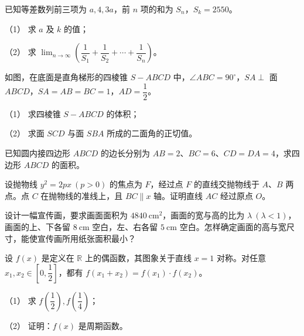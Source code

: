 \begin{question}
已知等差数列前三项为 $a,4,3a$，前 $n$ 项的和为 $S_n$，$S_k=2550$。

（1） 求 $a$ 及 $k$ 的值；

（2） 求 $\displaystyle\lim_{n\to\infty}\left(\dfrac1{S_1}+\dfrac1{S_2}+\cdots+\dfrac1{S_n}\right)$。

\Needspace{0.4\textheight}
\end{question}
\begin{question}
如图，在底面是直角梯形的四棱锥 $S-ABCD$ 中，$\angle ABC=90^\circ$，$SA\perp$ 面 $ABCD$，$SA=AB=BC=1$，$AD=\dfrac12$。
\nopagebreak[4]
\begin{center}\end{center}
\nopagebreak[4]
（1） 求四棱锥 $S-ABCD$ 的体积；

（2） 求面 $SCD$ 与面 $SBA$ 所成的二面角的正切值。

\end{question}
\begin{question}
已知圆内接四边形 $ABCD$ 的边长分别为 $AB=2$、$BC=6$、$CD=DA=4$，求四边形 $ABCD$ 的面积。

\end{question}
\begin{question}
设抛物线 $y^2=2px\ (p>0)$ 的焦点为 $F$，经过点 $F$ 的直线交抛物线于 $A$、$B$ 两点。点 $C$ 在抛物线的准线上，且 $BC\parallel x$ 轴。证明直线 $AC$ 经过原点 $O$。

\end{question}
\begin{question}
设计一幅宣传画，要求画面面积为 $4840\ \mathrm{cm}^2$，画面的宽与高的比为 $\lambda\ (\lambda<1)$，画面的上、下各留 $8\ \mathrm{cm}$ 空白，左、右各留 $5\ \mathrm{cm}$ 空白。怎样确定画面的高与宽尺寸，能使宣传画所用纸张面积最小？

\end{question}
\begin{question}
设 $f(x)$ 是定义在 $\mathbb R$ 上的偶函数，其图象关于直线 $x=1$ 对称。对任意 $x_1,x_2\in\left[0,\dfrac12\right]$，都有 $f(x_1+x_2)=f(x_1)\cdot f(x_2)$。

（1） 求 $f\left(\dfrac12\right),f\left(\dfrac14\right)$；

（2） 证明：$f(x)$ 是周期函数。

\end{question}
